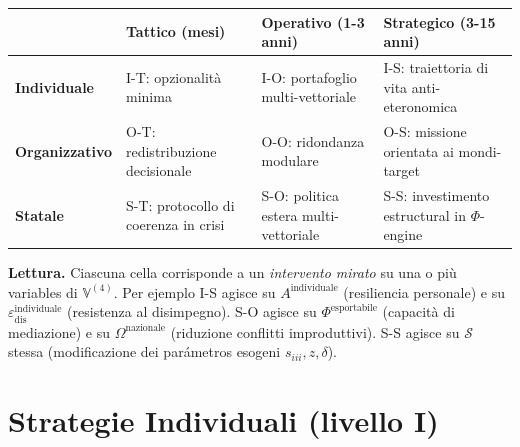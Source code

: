 {\def\LTcaptype{none} %
{\small\begin{longtable}[]{@{}
  >{\raggedright\arraybackslash}p{}
  >{\raggedright\arraybackslash}p{}
  >{\raggedright\arraybackslash}p{}
  >{\raggedright\arraybackslash}p{}@{}}
\toprule\noalign{}
\begin{minipage}[b]{\linewidth}\raggedright
\end{minipage} & \begin{minipage}[b]{\linewidth}\raggedright
\textbf{Tattico} (mesi)
\end{minipage} & \begin{minipage}[b]{\linewidth}\raggedright
\textbf{Operativo} (1-3 anni)
\end{minipage} & \begin{minipage}[b]{\linewidth}\raggedright
\textbf{Strategico} (3-15 anni)
\end{minipage} \\
\midrule\noalign{}
\endhead
\bottomrule\noalign{}
\endlastfoot
\textbf{Individuale} & I-T: opzionalità minima & I-O: portafoglio
multi-vettoriale & I-S: traiettoria di vita anti-eteronomica \\
\textbf{Organizzativo} & O-T: redistribuzione decisionale & O-O:
ridondanza modulare & O-S: missione orientata ai mondi-target \\
\textbf{Statale} & S-T: protocollo di coerenza in crisi & S-O: politica
estera multi-vettoriale & S-S: investimento estructural in
\(\Phi\)-engine \\
\end{longtable}}
}

\Proved{} \textbf{Lettura.} Ciascuna cella corrisponde a un
\emph{intervento mirato} su una o più variables di \(\mathbb{V}^{(4)}\).
Per ejemplo I-S agisce su \(A^{\text{individuale}}\) (resiliencia
personale) e su \(\varepsilon_{\text{dis}}^{\text{individuale}}\)
(resistenza al disimpegno). S-O agisce su \(\Phi^{\text{esportabile}}\)
(capacità di mediazione) e su \(\Omega^{\text{nazionale}}\) (riduzione
conflitti improduttivi). S-S agisce su \(\mathcal{S}\) stessa
(modificazione dei parámetros esogeni \(s_{iii}, z, \delta\)).



\section{Strategie Individuali (livello
I)}\label{strategie-individuali-livello-i}

